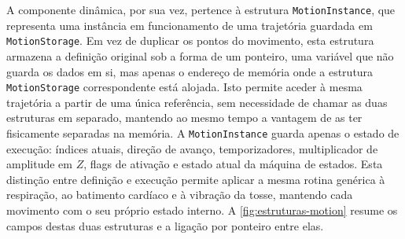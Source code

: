 A componente dinâmica, por sua vez, pertence à estrutura \texttt{MotionInstance}, que representa uma instância em funcionamento de uma trajetória guardada em \texttt{MotionStorage}. Em vez de duplicar os pontos do movimento, esta estrutura armazena a definição original sob a forma de um ponteiro, uma variável que não guarda os dados em si, mas apenas o endereço de memória onde a estrutura \texttt{MotionStorage} correspondente está alojada. Isto permite aceder à mesma trajetória a partir de uma única referência, sem necessidade de chamar as duas estruturas em separado, mantendo ao mesmo tempo a vantagem de as ter fisicamente separadas na memória. A \texttt{MotionInstance} guarda apenas o estado de execução: índices atuais, direção de avanço, temporizadores, multiplicador de amplitude em \(Z\), flags de ativação e estado atual da máquina de estados. Esta distinção entre definição e execução permite aplicar a mesma rotina genérica à respiração, ao batimento cardíaco e à vibração da tosse, mantendo cada movimento com o seu próprio estado interno. A \cref{fig:estruturas-motion} resume os campos destas duas estruturas e a ligação por ponteiro entre elas.

